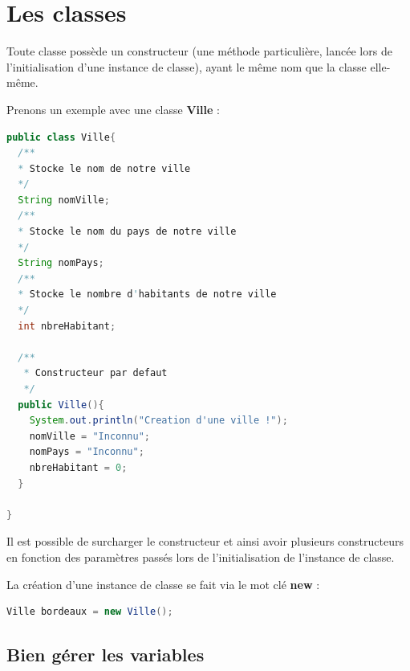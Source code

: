 \documentclass[a4paper,twoside]{article}
\begin{document}
\section{Les classes}\label{sec:les_classes}
Toute classe possède un constructeur (une méthode particulière, lancée lors de l'initialisation d'une instance de classe), ayant le même nom que la classe elle-même.

Prenons un exemple avec une classe \textbf{Ville} :
\begin{lstlisting}[language=java]
public class Ville{
  /**
  * Stocke le nom de notre ville
  */
  String nomVille;
  /**
  * Stocke le nom du pays de notre ville
  */
  String nomPays;
  /**
  * Stocke le nombre d'habitants de notre ville
  */
  int nbreHabitant;
 
  /**
   * Constructeur par defaut
   */
  public Ville(){
    System.out.println("Creation d'une ville !");      
    nomVille = "Inconnu";
    nomPays = "Inconnu";
    nbreHabitant = 0;
  }
 
}
\end{lstlisting}

\begin{remarque}
Il est possible de surcharger  le constructeur et ainsi avoir plusieurs constructeurs en fonction des paramètres passés lors de l'initialisation de l'instance de classe.
\end{remarque}

\bigskip

La création d'une instance de classe se fait via le mot clé \textbf{new} :
\begin{lstlisting}[language=java]
Ville bordeaux = new Ville();
\end{lstlisting}

\subsection{Bien gérer les variables}\label{sec:good_behavior}
\end{document}
